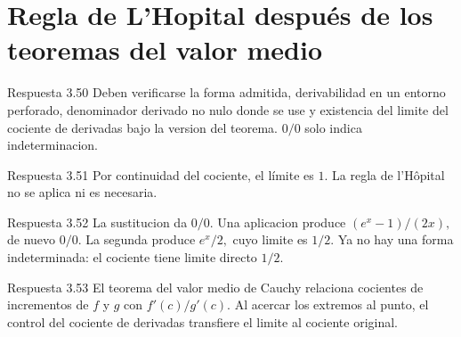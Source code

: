 \documentclass[10pt,a4paper,oneside,openany]{book}
\begin{document}
\section{Regla de L'Hopital después de los teoremas del valor medio}
\begin{PSevenAnswerFixed}{Respuesta 3.50}
Deben verificarse la forma admitida, derivabilidad en un entorno perforado, denominador derivado no nulo donde se use y existencia del limite del cociente de derivadas bajo la version del teorema. \(0/0\) solo indica indeterminacion.
\end{PSevenAnswerFixed}
\begin{PSevenAnswerFixed}{Respuesta 3.51}
Por continuidad del cociente, el límite es \(1\). La regla de l’Hôpital no se aplica ni es necesaria.
\end{PSevenAnswerFixed}
\begin{PSevenAnswerFixed}{Respuesta 3.52}
La sustitucion da \(0/0\). Una aplicacion produce \((e^x-1)/(2x),\) de nuevo \(0/0\). La segunda produce \(e^x/2,\) cuyo limite es \(1/2\). Ya no hay una forma indeterminada: el cociente tiene limite directo \(1/2\).
\end{PSevenAnswerFixed}
\begin{PSevenAnswerFixed}{Respuesta 3.53}
El teorema del valor medio de Cauchy relaciona cocientes de incrementos de \(f\) y \(g\) con \(f'(c)/g'(c)\). Al acercar los extremos al punto, el control del cociente de derivadas transfiere el limite al cociente original.
\end{PSevenAnswerFixed}
\end{document}
